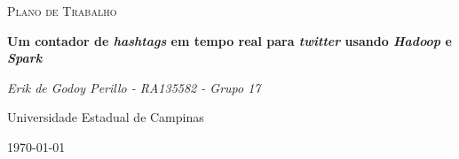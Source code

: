 \documentclass[11pt]{article}
\newcommand{\tit}[1]{\textit{#1}}
\begin{document}
\begin{titlepage}
	\centering
	{\scshape\Large Plano de Trabalho\par}
	\vspace{1.5cm}
	{\huge\bfseries Um contador de \tit{hashtags} em tempo real para 
		\tit{twitter} usando \tit{Hadoop} e \tit{Spark}\par}
	\vspace{1cm}
	{\itshape Erik de Godoy Perillo - RA135582 - Grupo 17\par}
	\vspace{0.5cm}
	\begin{abstract}
		Neste documento, descreve-se a proposta para uma aplicação das 
		ferramentas vistas na disciplina 
		MC855 - Projeto em Sistemas de Computação.
	\end{abstract}
	\vfill
	Universidade Estadual de Campinas 
	\vfill
	{\large \today\par}
\end{titlepage}
\end{document}
